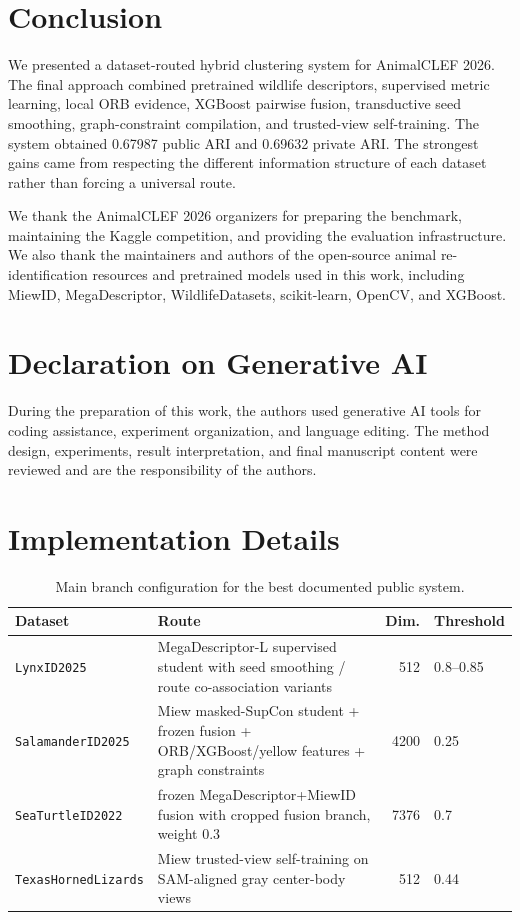 \documentclass{ceurart}
\newcommand{\dataset}[1]{\texttt{#1}}
\begin{document}
\section{Conclusion}
We presented a dataset-routed hybrid clustering system for AnimalCLEF 2026. The final approach combined pretrained wildlife descriptors, supervised metric learning, local ORB evidence, XGBoost pairwise fusion, transductive seed smoothing, graph-constraint compilation, and trusted-view self-training. The system obtained 0.67987 public ARI and 0.69632 private ARI. The strongest gains came from respecting the different information structure of each dataset rather than forcing a universal route.

\begin{acknowledgments}
We thank the AnimalCLEF 2026 organizers for preparing the benchmark, maintaining the Kaggle competition, and providing the evaluation infrastructure. We also thank the maintainers and authors of the open-source animal re-identification resources and pretrained models used in this work, including MiewID, MegaDescriptor, WildlifeDatasets, scikit-learn, OpenCV, and XGBoost.
\end{acknowledgments}

\section*{Declaration on Generative AI}
During the preparation of this work, the authors used generative AI tools for coding assistance, experiment organization, and language editing. The method design, experiments, result interpretation, and final manuscript content were reviewed and are the responsibility of the authors.

\appendix
\section{Implementation Details}
\label{app:implementation-details}
\begin{table}[h]
  \centering
  \caption{Main branch configuration for the best documented public system.}
  \label{tab:route-config}
  \small
  \begin{tabularx}{\linewidth}{lYrl}
    \toprule
    Dataset & Route & Dim. & Threshold \\
    \midrule
    \dataset{LynxID2025} & MegaDescriptor-L supervised student with seed smoothing / route co-association variants & 512 & 0.8--0.85 \\
    \dataset{SalamanderID2025} & Miew masked-SupCon student + frozen fusion + ORB/XGBoost/yellow features + graph constraints & 4200 & 0.25 \\
    \dataset{SeaTurtleID2022} & frozen MegaDescriptor+MiewID fusion with cropped fusion branch, weight 0.3 & 7376 & 0.7 \\
    \dataset{TexasHornedLizards} & Miew trusted-view self-training on SAM-aligned gray center-body views & 512 & 0.44 \\
    \bottomrule
  \end{tabularx}
\end{table}
\end{document}
